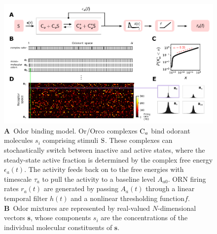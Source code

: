 \documentclass[9pt,twocolumn,twoside,lineno]{pnas-new}
\begin{document}
\begin{figure}[!tb]
	\centering
	\begin{subfigure}[t]{\linewidth}
		\label{fig:tuning_curves_a}
	\end{subfigure}
	\begin{subfigure}[t]{0\linewidth}
		\label{fig:tuning_curves_b}
	\end{subfigure}
	\begin{subfigure}[t]{0\linewidth}
		\label{fig:tuning_curves_c}
	\end{subfigure}
	\begin{subfigure}[t]{0\linewidth}
		\label{fig:tuning_curves_d}
	\end{subfigure}
	\begin{subfigure}[t]{0\linewidth}
		\label{fig:tuning_curves_e}
	\end{subfigure}
	\begin{subfigure}[t]{0\linewidth}
		\label{fig:tuning_curves_f}
	\end{subfigure}
	\includegraphics[width=\textwidth]{figures/1_tuning_curves}
	\caption{\footnotesize{
			\textbf{A}~Odor binding model. Or/Orco complexes $\textup{C}_a$ bind odorant molecules $s_i$ comprising stimuli $\textup{S}$. These complexes can stochastically switch between inactive and active states, where the steady-state active fraction is determined by the complex free energy $\epsilon_a(t)$. The activity feeds back on to the free energies with timescale $\tau_a$ to pull the activity to a baseline level $A_{a0}$. ORN firing rates $r_a(t)$ are generated by passing $A_a(t)$ through a linear temporal filter $h(t)$ and a nonlinear thresholding function$f$. 
			\textbf{B}~Odor mixtures are represented by real-valued $N$-dimensional vectors $\mathbf s$, whose components $s_i$ are the concentrations of  the individual molecular constituents  of $\mathbf s$. 
}}
\end{figure}
\end{document}
